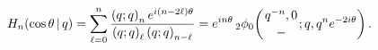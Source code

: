 \[\mathop{H_{n}\/}\nolimits\!\left(\mathop{\cos\/}\nolimits\theta\,|\,q\right)=%
\sum_{\ell=0}^{n}\frac{\left(q;q\right)_{n}e^{i(n-2\ell)\theta}}{\left(q;q%
\right)_{\ell}\left(q;q\right)_{n-\ell}}=e^{in\theta}\mathop{{{}_{2}\phi_{0}}%
\/}\nolimits\!\left({q^{-n},0\atop-};q,q^{n}e^{-2i\theta}\right).\]
